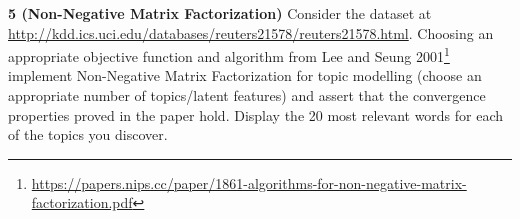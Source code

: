\documentclass[12pt,letterpaper,fleqn]{hmcpset}
\begin{document}
\textbf{5 (Non-Negative Matrix Factorization)} Consider the dataset at
\url{http://kdd.ics.uci.edu/databases/reuters21578/reuters21578.html}. Choosing an appropriate
objective function and algorithm from Lee and Seung 2001\footnote{\url{https://papers.nips.cc/paper/1861-algorithms-for-non-negative-matrix-factorization.pdf}}
implement Non-Negative Matrix Factorization for topic modelling (choose an appropriate number
of topics/latent features) and assert that the convergence properties proved in the paper hold. 
Display the 20 most relevant words for each of the topics you discover.
\end{document}
